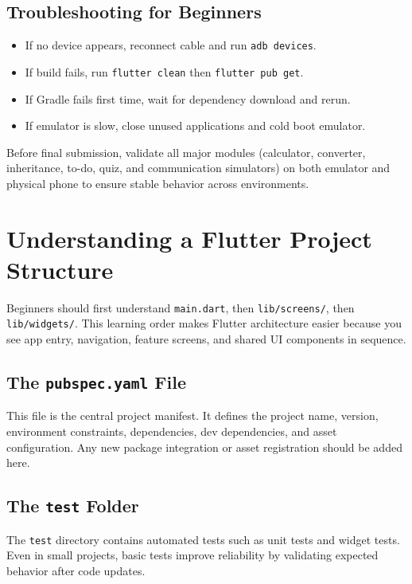 \documentclass{article}
\begin{document}
\subsection{Troubleshooting for Beginners}
\begin{itemize}
\item If no device appears, reconnect cable and run \texttt{adb devices}.
\item If build fails, run \texttt{flutter clean} then \texttt{flutter pub get}.
\item If Gradle fails first time, wait for dependency download and rerun.
\item If emulator is slow, close unused applications and cold boot emulator.
\end{itemize}

\begin{insightbox}
Before final submission, validate all major modules (calculator, converter, inheritance, to-do, quiz, and communication simulators) on both emulator and physical phone to ensure stable behavior across environments.
\end{insightbox}


\section{Understanding a Flutter Project Structure}

\begin{reportbox}
Beginners should first understand \texttt{main.dart}, then \texttt{lib/screens/}, then \texttt{lib/widgets/}. This learning order makes Flutter architecture easier because you see app entry, navigation, feature screens, and shared UI components in sequence.
\end{reportbox}

\subsection{The \texttt{pubspec.yaml} File}
This file is the central project manifest. It defines the project name, version, environment constraints, dependencies, dev dependencies, and asset configuration. Any new package integration or asset registration should be added here.

\subsection{The \texttt{test} Folder}
The \texttt{test} directory contains automated tests such as unit tests and widget tests. Even in small projects, basic tests improve reliability by validating expected behavior after code updates.
\end{document}
